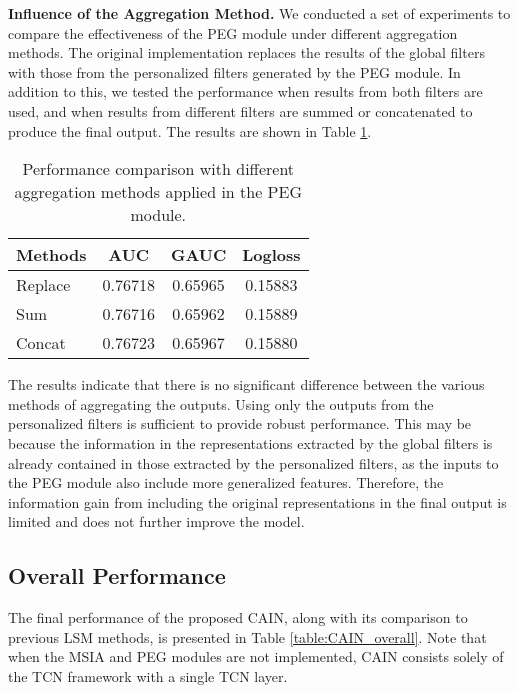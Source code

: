 \textbf{Influence of the Aggregation Method.} We conducted a set of experiments to compare the effectiveness of the PEG module under different aggregation methods. The original implementation replaces the results of the global filters with those from the personalized filters generated by the PEG module. In addition to this, we tested the performance when results from both filters are used, and when results from different filters are summed or concatenated to produce the final output. The results are shown in Table \ref{tab:PEG_agg}.

\begin{table}[t]
    \centering
    \caption{Performance comparison with different aggregation methods applied in the PEG module. }
    \begin{adjustbox}{max width=1.0\linewidth}
    \begin{tabular}{cccc}
    \toprule
     Methods & AUC & GAUC & Logloss \\
    \midrule
    \multicolumn{1}{l|}{Replace} & 0.76718 & 0.65965 & 0.15883 \\
    \midrule
    \multicolumn{1}{l|}{Sum} & 0.76716 & 0.65962 & 0.15889 \\
    \midrule
    \multicolumn{1}{l|}{Concat} & 0.76723 & 0.65967 & 0.15880 \\
    \bottomrule
    \end{tabular}
    \end{adjustbox} 
\label{tab:PEG_agg}
\vspace{-0.5cm}
\end{table}

The results indicate that there is no significant difference between the various methods of aggregating the outputs. Using only the outputs from the personalized filters is sufficient to provide robust performance. This may be because the information in the representations extracted by the global filters is already contained in those extracted by the personalized filters, as the inputs to the PEG module also include more generalized features. Therefore, the information gain from including the original representations in the final output is limited and does not further improve the model. 

\subsection{Overall Performance}

The final performance of the proposed CAIN, along with its comparison to previous LSM methods, is presented in Table \ref{table:CAIN_overall}. Note that when the MSIA and PEG modules are not implemented, CAIN consists solely of the TCN framework with a single TCN layer.

